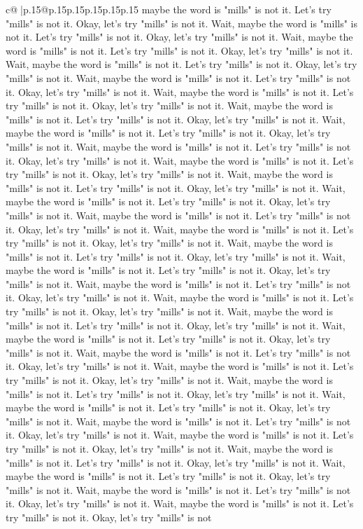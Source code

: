 \documentclass{article}
\begin{document}
{\begin{supertabular}{c@{$\;$}|p{.15\linewidth}@{}p{.15\linewidth}p{.15\linewidth}p{.15\linewidth}p{.15\linewidth}p{.15\linewidth}}
{{{maybe the word is "mills" is not it. Let's try "mills" is not it. Okay, let's try "mills" is not it. Wait, maybe the word is "mills" is not it. Let's try "mills" is not it. Okay, let's try "mills" is not it. Wait, maybe the word is "mills" is not it. Let's try "mills" is not it. Okay, let's try "mills" is not it. Wait, maybe the word is "mills" is not it. Let's try "mills" is not it. Okay, let's try "mills" is not it. Wait, maybe the word is "mills" is not it. Let's try "mills" is not it. Okay, let's try "mills" is not it. Wait, maybe the word is "mills" is not it. Let's try "mills" is not it. Okay, let's try "mills" is not it. Wait, maybe the word is "mills" is not it. Let's try "mills" is not it. Okay, let's try "mills" is not it. Wait, maybe the word is "mills" is not it. Let's try "mills" is not it. Okay, let's try "mills" is not it. Wait, maybe the word is "mills" is not it. Let's try "mills" is not it. Okay, let's try "mills" is not it. Wait, maybe the word is "mills" is not it. Let's try "mills" is not it. Okay, let's try "mills" is not it. Wait, maybe the word is "mills" is not it. Let's try "mills" is not it. Okay, let's try "mills" is not it. Wait, maybe the word is "mills" is not it. Let's try "mills" is not it. Okay, let's try "mills" is not it. Wait, maybe the word is "mills" is not it. Let's try "mills" is not it. Okay, let's try "mills" is not it. Wait, maybe the word is "mills" is not it. Let's try "mills" is not it. Okay, let's try "mills" is not it. Wait, maybe the word is "mills" is not it. Let's try "mills" is not it. Okay, let's try "mills" is not it. Wait, maybe the word is "mills" is not it. Let's try "mills" is not it. Okay, let's try "mills" is not it. Wait, maybe the word is "mills" is not it. Let's try "mills" is not it. Okay, let's try "mills" is not it. Wait, maybe the word is "mills" is not it. Let's try "mills" is not it. Okay, let's try "mills" is not it. Wait, maybe the word is "mills" is not it. Let's try "mills" is not it. Okay, let's try "mills" is not it. Wait, maybe the word is "mills" is not it. Let's try "mills" is not it. Okay, let's try "mills" is not it. Wait, maybe the word is "mills" is not it. Let's try "mills" is not it. Okay, let's try "mills" is not it. Wait, maybe the word is "mills" is not it. Let's try "mills" is not it. Okay, let's try "mills" is not it. Wait, maybe the word is "mills" is not it. Let's try "mills" is not it. Okay, let's try "mills" is not it. Wait, maybe the word is "mills" is not it. Let's try "mills" is not it. Okay, let's try "mills" is not it. Wait, maybe the word is "mills" is not it. Let's try "mills" is not it. Okay, let's try "mills" is not it. Wait, maybe the word is "mills" is not it. Let's try "mills" is not it. Okay, let's try "mills" is not it. Wait, maybe the word is "mills" is not it. Let's try "mills" is not it. Okay, let's try "mills" is not it. Wait, maybe the word is "mills" is not it. Let's try "mills" is not it. Okay, let's try "mills" is not it. Wait, maybe the word is "mills" is not it. Let's try "mills" is not it. Okay, let's try "mills" is not it. Wait, maybe the word is "mills" is not it. Let's try "mills" is not it. Okay, let's try "mills" is not }}}
\end{supertabular}}
\end{document}
